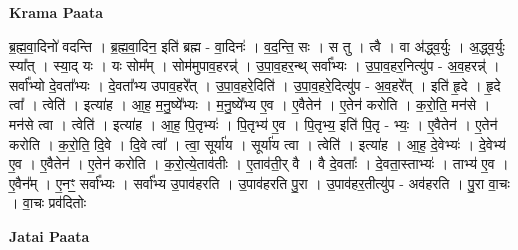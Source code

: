 \documentclass[17pt]{extarticle}
\begin{document}
\textbf{Krama Paata} \newline

ब्र॒ह्म॒वा॒दिनो॑ वदन्ति । ब्र॒ह्म॒वा॒दिन॒ इति॑ ब्रह्म - वा॒दिनः॑ । व॒द॒न्ति॒ सः । स तु । त्वै । वा अ॑द्ध्व॒र्युः । अ॒द्ध्व॒र्युः स्या᳚त् । स्या॒द् यः । यः सोम᳚म् । सोम॑मुपाव॒हरन्न्॑ । उ॒पा॒व॒हर॒न्थ् सर्वा᳚भ्यः । उ॒पा॒व॒हर॒नित्यु॑प - अ॒व॒हरन्न्॑ । सर्वा᳚भ्यो दे॒वता᳚भ्यः । दे॒वता᳚भ्य उपाव॒हरे᳚त् । उ॒पा॒व॒हरे॒दिति॑ । उ॒पा॒व॒हरे॒दित्यु॑प - अ॒व॒हरे᳚त् । इति॑ हृ॒दे । हृ॒दे त्वा᳚ । त्वेति॑ । इत्या॑ह । आ॒ह॒ म॒नु॒ष्ये᳚भ्यः । म॒नु॒ष्ये᳚भ्य ए॒व । ए॒वैतेन॑ । ए॒तेन॑ करोति । क॒रो॒ति॒ मन॑से । मन॑से त्वा । त्वेति॑ । इत्या॑ह । आ॒ह॒ पि॒तृभ्यः॑ । पि॒तृभ्य॑ ए॒व । पि॒तृभ्य॒ इति॑ पि॒तृ - भ्यः॒ । ए॒वैतेन॑ । ए॒तेन॑ करोति । क॒रो॒ति॒ दि॒वे । दि॒वे त्वा᳚ । त्वा॒ सूर्या॑य । सूर्या॑य त्वा । त्वेति॑ । इत्या॑ह । आ॒ह॒ दे॒वेभ्यः॑ । दे॒वेभ्य॑ ए॒व । ए॒वैतेन॑ । ए॒तेन॑ करोति । क॒रो॒त्ये॒ताव॑तीः । ए॒ताव॑ती॒र् वै । वै दे॒वताः᳚ । दे॒वता॒स्ताभ्यः॑ । ताभ्य॑ ए॒व । ए॒वैन᳚म् । ए॒नꣳ॒॒ सर्वा᳚भ्यः । सर्वा᳚भ्य उ॒पाव॑हरति । उ॒पाव॑हरति पु॒रा । उ॒पाव॑हर॒तीत्यु॑प - अव॑हरति । पु॒रा वा॒चः । वा॒चः प्रव॑दितोः \newline

\textbf{Jatai Paata} \newline
\end{document}
